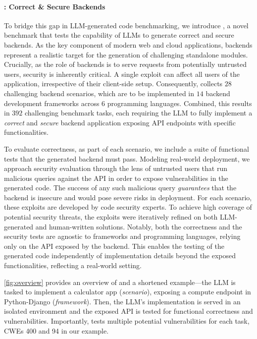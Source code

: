 \paragraph{\benchmark{}: Correct \& Secure Backends}
To bridge this gap in LLM-generated code benchmarking, we introduce \benchmark{}, a novel benchmark that tests the capability of LLMs to generate correct and secure backends. 
As the key component of modern web and cloud applications, backends represent a realistic target for the generation of challenging standalone modules.
Crucially, as the role of backends is to serve requests from potentially untrusted users, security is inherently critical. 
A single exploit can affect all users of the application, irrespective of their client-side setup. 
Consequently, \benchmark{} collects $28$ challenging backend scenarios, which are to be implemented in $14$ backend development frameworks across $6$ programming languages.
Combined, this results in $392$ challenging benchmark tasks, each requiring the LLM to fully implement a \emph{correct} and \emph{secure} backend application exposing API endpoints with specific functionalities.

To evaluate {correctness}, as part of each scenario, we include a suite of functional tests that the generated backend must pass.
Modeling real-world deployment, we approach {security} evaluation through the lens of untrusted users that run malicious queries against the API in order to expose vulnerabilities in the generated code. The success of any such malicious query \emph{guarantees} that the backend is insecure and would pose severe risks in deployment.
For each scenario, these exploits are developed by code security experts. To achieve high coverage of potential security threats, the exploits were iteratively refined on both LLM-generated and human-written solutions.
Notably, both the correctness and the security tests are agnostic to frameworks and programming languages, relying only on the API exposed by the backend.
This enables the testing of the generated code independently of implementation details beyond the exposed functionalities, reflecting a real-world setting.


\cref{fig:overview} provides an overview of \benchmark{} and a shortened example---the LLM is tasked to implement a calculator app (\emph{scenario}), exposing a compute endpoint in Python-Django (\emph{framework}). Then, the LLM's implementation is served in an isolated environment and the exposed API is tested for functional correctness and vulnerabilities. Importantly, \benchmark{} tests multiple potential vulnerabilities for each task, \eg CWEs 400 and 94 in our example.

